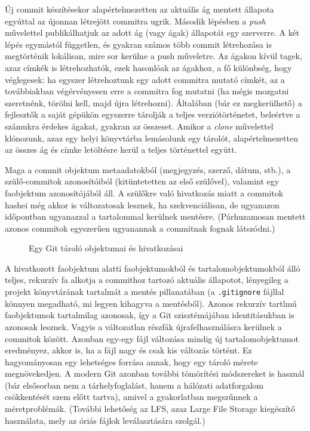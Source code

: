 \documentclass[
]{elteikthesis}[2025/03/25]
\begin{document}
Új commit készítésekor alapértelmezetten az aktuális ág mentett állapota egyúttal az újonnan létrejött commitra ugrik.
Második lépésben a \textit{push} művelettel publikálhatjuk az adott ág (vagy ágak) állapotát egy szerverre.
A két lépés egymástól független,
és gyakran számos több commit létrehozása is megtörténik lokálisan,
mire sor kerülne a push műveletre.
Az ágakon kívül tagek, azaz címkék is létrehozhatók,
ezek hasonlóak az ágakhoz,
a fő különbség, hogy véglegesek:
ha egyszer létrehoztunk egy adott commitra mutató címkét,
az a továbbiakban végérvényesen erre a commitra fog mutatni
(ha mégis mozgatni szeretnénk, törölni kell, majd újra létrehozni).
Általában (bár ez megkerülhető) a fejlesztők a saját gépükön
egyszerre tárolják a teljes verziótörténetet,
beleértve a számukra érdekes ágakat, gyakran az összeset.
Amikor a \textit{clone} művelettel klónozunk, azaz egy helyi könyvtárba lemásolunk egy tárolót,
alapértelmezetten az összes ág és címke letöltésre kerül a teljes történettel együtt.

Maga a commit objektum metaadatokból (megjegyzés, szerző, dátum, stb.),
a szülő-commitok azonosítóiból (kitüntetetten az első szülővel),
valamint egy faobjektum azonosítójából áll.
A szülőkre való hivatkozás miatt a commitok hashei még akkor is változatosak lesznek,
ha szekvenciálisan, de ugyanazon időpontban ugyanazzal a tartalommal kerülnek mentésre.
(Párhuzamosan mentett azonos commitok egyszerűen ugyanannak a commitnak fognak látszódni.)

\begin{figure}[bp!]
\centering

\caption{Egy Git tároló objektumai és hivatkozásai}
\label{fig:git-dag}
\end{figure}
A hivatkozott faobjektum alatti faobjektumokból és tartalomobjektumokból álló
teljes, rekurzív fa alkotja a commithoz tartozó aktuális állapotot,
lényegileg a projekt könyvtárának tartalmát a mentés pillanatában
(a \texttt{.gitignore} fájllal könnyen megadható, mi legyen kihagyva a mentésből).
Azonos rekurzív tartlmú faobjektumok tartalmilag azonosak,
így a Git szisztémájában identitásukban is azonosak lesznek.
Vagyis a változatlan részfák újrafelhasználásra kerülnek a commitok között.
Azonban egy-egy fájl változása mindig új tartalomobjektumot eredményez,
akkor is, ha a fájl nagy és csak kis változás történt.
Ez hagyományosan egy lehetséges forrása annak, hogy egy tároló mérete megnövekedjen.
A modern Git azonban további tömörítési módszereket is használ
(bár elsősorban nem a tárhelyfoglalást, hanem a hálózati adatforgalom csökkentését szem előtt tartva),
amivel a gyakorlatban megszűnnek a méretproblémák.
(További lehetőség az LFS, azaz Large File Storage kiegészítő használata,
mely az óriás fájlok leválasztására szolgál.)
\end{document}
